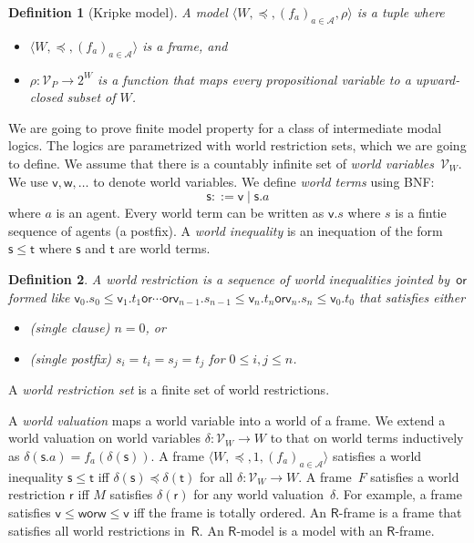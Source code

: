 \documentclass[doctor]{iscs-thesis}
\newcommand{\pvar}{\mathcal V_P}
\newcommand{\agents}{\mathcal A}
\newcommand{\wvar}{\mathcal V_W}
\newcommand{\tuple}[1]{\langle{#1}\rangle}
\newtheorem{definition}{Definition}
\newcommand{\wor}{\mathsf{{or}}}
\begin{document}
\begin{definition}[Kripke model]
A \textit{model} $\tuple{W,\preceq, (f_a)_{a\in \agents},\rho}$ is a tuple where
\begin{itemize}
 \item $\tuple{W,\preceq,(f_a)_{a\in \agents}}$ is a frame, and
 \item $\rho\colon \pvar\rightarrow 2^W$ is a function that maps every
       propositional variable to a upward-closed subset of $W\!$.
\end{itemize} 
\end{definition}

We are going to prove finite model property for a class of
intermediate modal logics.  The logics are parametrized with
world restriction sets,  which we are going to define.
We assume that there is a countably infinite set of \textit{world
variables}~$\wvar$.
We use $\mathsf v, \mathsf w,\ldots$ to denote world variables.
We define \textit{world terms} using BNF:
\[
 \mathsf s::=\mathsf v\mid \mathsf s.a
\]
where $a$ is an agent.
Every world term can be written as $\mathsf v.s$ where $s$ is a fintie sequence
of agents (a postfix).
A \textit{world inequality} is an inequation of the form $\mathsf s\le
\mathsf t$ where $\mathsf s$ and $\mathsf t$ are world terms.
\begin{definition}
A world restriction is a sequence of world inequalities jointed
 by~$\wor$ formed like
 $\mathsf v_0.s_0\le\mathsf v_1.t_1\wor\cdots\wor
 \mathsf v_{n-1}.s_{n-1}\le\mathsf v_n.t_n\wor \mathsf v_n.s_n\le\mathsf
 v_0.t_0$ that satisfies either
 \begin{itemize}
  \item (single clause) $n=0$, or
  \item (single postfix) $s_i = t_i = s_j = t_{j}$ for $0\le i,j\le n$.
 \end{itemize}
\end{definition}
A \textit{world restriction set} is a finite set of world restrictions.

A \textit{world valuation} maps a world variable into a world of a frame.
We extend a world valuation on world variables
$\delta\colon\mathcal V_W\rightarrow W$ to that on world terms
inductively as $\delta(\mathsf s.a)=f_a(\delta(\mathsf s))$.
A frame $\tuple{W,\preceq, 1,(f_a)_{a\in\agents}}$ satisfies a world inequality
$\mathsf s\le\mathsf t$ iff $\delta(\mathsf s)\preceq \delta(\mathsf t)$
for all $\delta\colon\mathcal V_W\rightarrow W$.
A frame~$F$ satisfies a world restriction $\mathsf r$
iff $M$ satisfies $\delta(\mathsf r)$ for any world valuation~$\delta$.
For example, a frame satisfies $\mathsf v\le \mathsf w\wor\mathsf
w\le\mathsf v$ iff the frame is totally ordered.
An $\mathsf R$-frame is a frame that
satisfies all world restrictions in~$\mathsf R$.
An $\mathsf R$-model is a model with an $\mathsf R$-frame.
\end{document}
